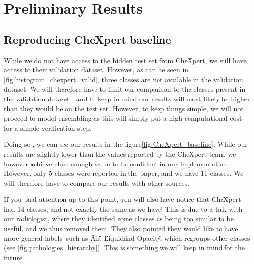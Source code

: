 \documentclass[11pt]{article}
\begin{document}
    \section{Preliminary Results}

        \subsection{Reproducing CheXpert baseline}

            While we do not have access to the hidden test set from CheXpert, we still have access to their validation dataset. However,
            as can be seen in \ref{fig:histogram_chexpert_valid}, three classes are not available in the validation dataset. We will therefore have to
            limit our comparison to the classes present in the validation dataset , and to keep in mind our results will
            most likely be higher than they would be on the test set. However, to keep things simple, we will not proceed to model ensembling as this
            will simply put a high computational cost for a simple verification step.


    Doing so , we can see our results in the figure\ref{fig:CheXpert_baseline}. While our results are slightly lower than
    the values reported by the CheXpert team, we however achieve close enough value to be confident in our implementation.
    However, only 5 classes were reported in the paper, and we have 11 classes. We will therefore have to compare our results with other sources.

    If you paid attention up to this point, you will also have notice that CheXpert had 14 classes, and not exactly the same as we have!
    This is due to a talk with our radiologist, where they identified some classes as being too similar to be useful, and we thus removed them. They also pointed they would like to have
    more general labels, such as \"Air\", \"Liquid\" and \"Opacity\", which regroups other classes (see \ref{fig:pathologies_hierarchy}). This is something we will keep in mind for the future.
\end{document}
